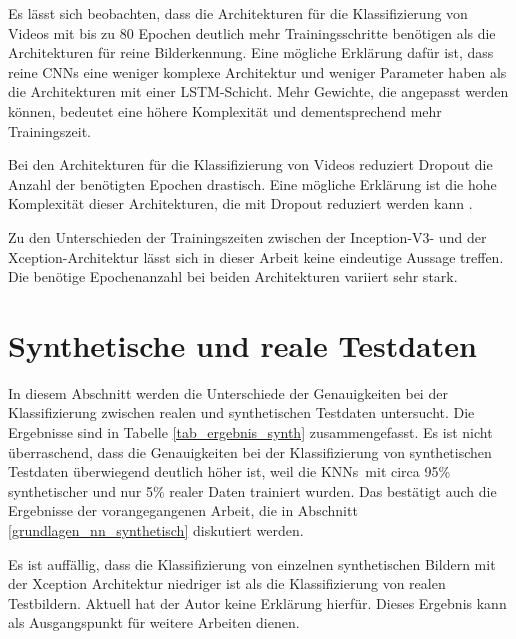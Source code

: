 Es lässt sich beobachten, dass die Architekturen für die Klassifizierung von Videos mit bis zu 80 Epochen deutlich mehr Trainingsschritte benötigen als die Architekturen für reine Bilderkennung. Eine mögliche Erklärung dafür ist, dass reine \acp{CNN} eine weniger komplexe Architektur und weniger Parameter haben als die Architekturen mit einer \ac{LSTM}-Schicht. Mehr Gewichte, die angepasst werden können, bedeutet eine höhere Komplexität und dementsprechend mehr Trainingszeit.

Bei den Architekturen für die Klassifizierung von Videos reduziert Dropout die Anzahl der benötigten Epochen drastisch. Eine mögliche Erklärung ist die hohe Komplexität dieser Architekturen, die mit Dropout reduziert werden kann \cite{hinton2012improving}.

Zu den Unterschieden der Trainingszeiten zwischen der Inception-V3- und der Xception-Architektur lässt sich in dieser Arbeit keine eindeutige Aussage treffen. Die benötige Epochenanzahl bei beiden Architekturen variiert sehr stark.

\section{Synthetische und reale Testdaten}
\label{ergebnis_synth_vs_real}

In diesem Abschnitt werden die Unterschiede der Genauigkeiten bei der Klassifizierung zwischen realen und synthetischen Testdaten untersucht. Die Ergebnisse sind in Tabelle \ref{tab_ergebnis_synth} zusammengefasst. Es ist nicht überraschend, dass die Genauigkeiten bei der Klassifizierung von synthetischen Testdaten überwiegend deutlich höher ist, weil die \acp{KNN} mit circa 95\% synthetischer und nur 5\% realer Daten trainiert wurden. Das bestätigt auch die Ergebnisse der vorangegangenen Arbeit, die in Abschnitt \ref{grundlagen_nn_synthetisch} diskutiert werden. 

Es ist auffällig, dass die Klassifizierung von einzelnen synthetischen Bildern mit der Xception Architektur niedriger ist als die Klassifizierung von realen Testbildern. Aktuell hat der Autor keine Erklärung hierfür. Dieses Ergebnis kann als Ausgangspunkt für weitere Arbeiten dienen.


